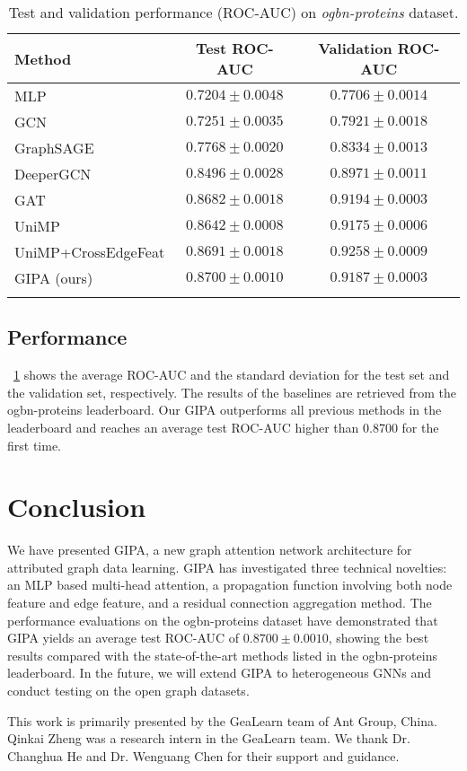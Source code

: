 \documentclass[sigconf]{acmart}
\newcommand{\model}{GIPA\xspace}
\begin{document}
\begin{table}[!h]
\caption{Test and validation performance (ROC-AUC) on \textit{ogbn-proteins} dataset.}
\begin{tabular}{lcc}
\hline
Method              & Test ROC-AUC  & Validation ROC-AUC \\ \hline
MLP                 & $0.7204\pm0.0048$ & $0.7706\pm0.0014$      \\
GCN                 & $0.7251\pm0.0035$ & $0.7921\pm0.0018$      \\
GraphSAGE           & $0.7768\pm0.0020$ & $0.8334\pm0.0013$      \\
DeeperGCN           & $0.8496\pm0.0028$ & $0.8971\pm0.0011$      \\
GAT                 & $0.8682\pm0.0018$ & $0.9194\pm0.0003$      \\
UniMP               & $0.8642\pm0.0008$ & $0.9175\pm0.0006$      \\
UniMP+CrossEdgeFeat & $0.8691\pm0.0018$ & $\mathbf{0.9258\pm0.0009}$      \\
GIPA (ours)         & $\mathbf{0.8700\pm0.0010}$ & $0.9187\pm0.0003$      \\ \hline
\label{tab:performance}
\end{tabular}
\end{table}
\subsection{Performance}
\tablename~\ref{tab:performance} shows the average ROC-AUC and the standard deviation for the test set and the validation set, respectively. The results of the baselines are retrieved from the ogbn-proteins leaderboard\footnotemark[1]. Our \model outperforms all previous methods in the leaderboard and reaches an average test ROC-AUC higher than 0.8700 for the first time.
% 
\section{Conclusion}
\label{sec:conclusion}
We have presented \model, a new graph attention network architecture for attributed graph data learning.
\model has investigated three technical novelties: an MLP based multi-head attention, a propagation function involving both node feature and edge feature, and a residual connection  aggregation method.
The performance evaluations on the ogbn-proteins dataset have demonstrated that \model yields an average test ROC-AUC of $0.8700\pm 0.0010$, showing the best results compared with the state-of-the-art methods listed in the ogbn-proteins leaderboard. In the future, we will extend \model to heterogeneous GNNs and conduct testing on the open graph datasets.  
\begin{acks}
This work is primarily presented by the GeaLearn team of Ant Group, China.
Qinkai Zheng was a research intern in the GeaLearn team.
We thank Dr. Changhua He and Dr. Wenguang Chen for their support and guidance. \end{acks}



\end{document}
